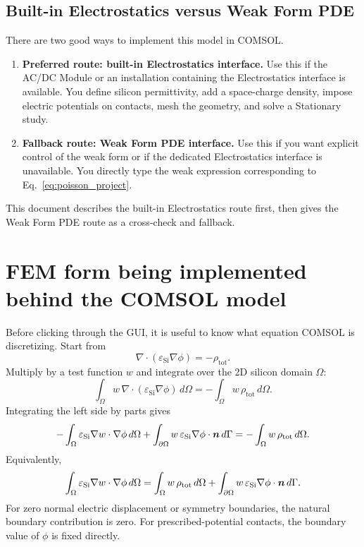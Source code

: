 \documentclass[11pt]{article}
\newcommand{\epss}{\varepsilon_{\mathrm{Si}}}
\newcommand{\rhotot}{\rho_{\mathrm{tot}}}
\newcommand{\test}{w}
\begin{document}
\subsection{Built-in Electrostatics versus Weak Form PDE}

There are two good ways to implement this model in COMSOL.

\begin{enumerate}[leftmargin=2em]
\item \textbf{Preferred route: built-in Electrostatics interface.} Use this if the AC/DC Module or an installation containing the Electrostatics interface is available. You define silicon permittivity, add a space-charge density, impose electric potentials on contacts, mesh the geometry, and solve a Stationary study.
\item \textbf{Fallback route: Weak Form PDE interface.} Use this if you want explicit control of the weak form or if the dedicated Electrostatics interface is unavailable. You directly type the weak expression corresponding to Eq.~\eqref{eq:poisson_project}.
\end{enumerate}

This document describes the built-in Electrostatics route first, then gives the Weak Form PDE route as a cross-check and fallback.

\section{FEM form being implemented behind the COMSOL model}

Before clicking through the GUI, it is useful to know what equation COMSOL is discretizing. Start from
\begin{equation}
\nabla\cdot(\epss\nabla\phi)=-\rhotot.
\end{equation}
Multiply by a test function $\test$ and integrate over the 2D silicon domain $\Omega$:
\begin{equation}
\int_{\Omega}\test\,\nabla\cdot(\epss\nabla\phi)\,d\Omega=-\int_{\Omega}\test\,\rhotot\,d\Omega.
\end{equation}
Integrating the left side by parts gives
\begin{equation}
-\int_{\Omega}\epss\nabla\test\cdot\nabla\phi\,d\Omega+\int_{\partial\Omega}\test\,\epss\nabla\phi\cdot\nvec\,d\Gamma=-\int_{\Omega}\test\,\rhotot\,d\Omega.
\end{equation}
Equivalently,
\begin{equation}
\int_{\Omega}\epss\nabla\test\cdot\nabla\phi\,d\Omega=\int_{\Omega}\test\,\rhotot\,d\Omega+\int_{\partial\Omega}\test\,\epss\nabla\phi\cdot\nvec\,d\Gamma.
\label{eq:weak_module2}
\end{equation}
For zero normal electric displacement or symmetry boundaries, the natural boundary contribution is zero. For prescribed-potential contacts, the boundary value of $\phi$ is fixed directly.
\end{document}
